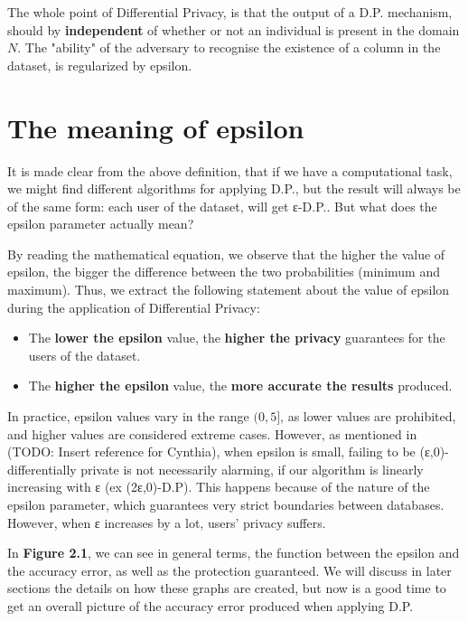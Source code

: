 The whole point of Differential Privacy, is that the output of a D.P. mechanism, should by \textbf{independent} of whether or not an individual is present in the domain $N$. The "ability" of the adversary to recognise the existence of a column in the dataset, is regularized by epsilon.

\section{The meaning of epsilon}
It is made clear from the above definition, that if we have a computational task, we might find different algorithms for applying D.P., but the result will always be of the same form: each user of the dataset, will get ε-D.P.. But what does the epsilon parameter actually mean?

By reading the mathematical equation, we observe that the higher the value of epsilon, the bigger the difference between the two probabilities (minimum and maximum). Thus, we extract the following statement about the value of epsilon during the application of Differential Privacy:

\begin{itemize}
    \item The \textbf{lower the epsilon} value, the \textbf{higher the privacy} guarantees for the users of the dataset.
    \item The \textbf{higher the epsilon} value, the \textbf{more accurate the results} produced.
\end{itemize}

In practice, epsilon values vary in the range $(0,5]$, as lower values are prohibited, and higher values are considered extreme cases. However, as mentioned in (TODO: Insert reference for Cynthia),  when epsilon is small, failing to be (ε,0)-differentially private is not necessarily alarming, if our algorithm is linearly increasing with ε (ex (2ε,0)-D.P). This happens because of the nature of the epsilon parameter, which guarantees very strict boundaries between databases. However, when ε increases by a lot, users' privacy suffers. 

In \textbf{Figure 2.1}, we can see in general terms, the function between the epsilon and the accuracy error, as well as the protection guaranteed. We will discuss in later sections the details on how these graphs are created, but now is a good time to get an overall picture of the accuracy error produced when applying D.P.
\bigskip
\bigskip\bigskip

